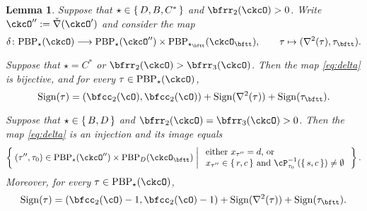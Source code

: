 \documentclass[12pt,a4paper]{amsart}
\def\DD{\nabla}
\numberwithin{equation}{section}
\newtheorem{lem}[thm]{Lemma}
\theoremstyle{remark}
\def\ssign{\mathrm{Sign}}
\def\ckcOpp{\ckcO^{\prime\prime}}
\def\ckDD{{\check\DD}}
\def\PBP{\mathrm{PBP}}
\begin{document}
\begin{lem}
\label{lem:delta}
Suppose that $\star \in \set{D,B,C^*}$ and $\bfrr_2(\ckcO)>0$. Write $\ckcOpp := \ckDD(\ckcO')$ and consider the map
\begin{equation}\label{eq:delta}
  \delta  \colon \PBP_\star(\ckcO)\longrightarrow
    \PBP_\star(\ckcOpp)\times \PBP_{\star_\bftt}(\ckcO_\bftt),
    \qquad \tau \mapsto (\DD^2(\tau),\tau_\bftt).
\end{equation}
\begin{enuma}
\item Suppose that
$\star = C^*$ or $\bfrr_2(\ckcO)>\bfrr_3(\ckcO)$. Then the map \eqref{eq:delta} is bijective, and for every $\tau\in  \PBP_\star(\ckcO) $,
\begin{equation}\label{eq:sign.D}
\ssign(\tau)
=(\bfcc_2(\cO),\bfcc_2(\cO))+\ssign(\DD^2(\tau))+\ssign(\tau_\bftt).
\end{equation}

\item Suppose that  $\star \in \set{B,D}$ and $\bfrr_2(\ckcO)=\bfrr_3(\ckcO)>0$.
Then the map \eqref{eq:delta} is an  injection and its  image equals
\begin{equation}\label{eq:delta.I}
    \Set{ (\tau'',\tau_0)  \in \PBP_\star(\ckcOpp)\times \PBP_D(\ckcO_\bftt)  |
    \begin{array}{l}
        \text{either
    $x_{\tau''} = d$, or} \\
    \text{$x_{\tau''}\in \set{r,c}$  and
    $\cP_{\tau_0}^{-1}(\set{s,c})\neq \emptyset$}
    \end{array}
}.
\end{equation}
Moreover,  for every $\tau\in  \PBP_\star(\ckcO) $,
\begin{equation}\label{eq:sign.GD}
\ssign(\tau)
=(\bfcc_2(\cO)-1,\bfcc_2(\cO)-1)+\ssign(\DD^2(\tau))+\ssign(\tau_\bftt).
\end{equation}
\end{enuma}
\end{lem}
\end{document}
